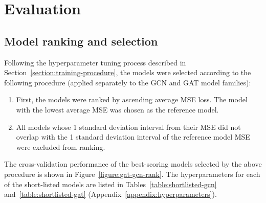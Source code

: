 \chapter{Evaluation}
\label{chapter:evaluation}


\section{Model ranking and selection}
\label{section:model-ranking}
Following the hyperparameter tuning process described in Section~\ref{section:training-procedure}, the models were selected according to the following procedure (applied separately to the GCN and GAT model families):
\begin{enumerate}
    \item First, the models were ranked by ascending average MSE loss. The model with the lowest average MSE was chosen as the reference model.
    \item All models whose 1 standard deviation interval from their MSE did not overlap with the 1 standard deviation interval of the reference model MSE were excluded from ranking.
\end{enumerate}

The cross-validation performance of the best-scoring models selected by the above procedure is shown in Figure~\ref{figure:gat-gcn-rank}. The hyperparameters for each of the short-listed models are listed in Tables~\ref{table:shortlisted-gcn} and~\ref{table:shortlisted-gat} (Appendix~\ref{appendix:hyperparameters}).

